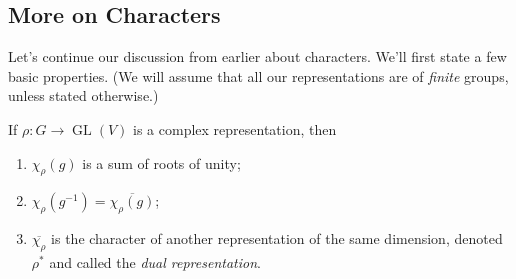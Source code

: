

\subsection{More on Characters}

Let's continue our discussion from earlier about characters. We'll first state a few basic properties. (We will assume that all our representations are of \emph{finite} groups, unless stated otherwise.)

\begin{proposition}
If $\rho: G \to \operatorname{GL}(V)$ is a complex representation, then
\begin{enumerate}[label = (\alph*)]
    \item $\chi_\rho(g)$ is a sum of roots of unity;
    \item $\chi_\rho(g^{-1}) = \overline{\chi_\rho(g)}$;
    \item $\overline{\chi_\rho}$ is the character of another representation of the same dimension, denoted $\rho^*$ and called the \emph{dual representation}. %
\end{enumerate}
\end{proposition}

